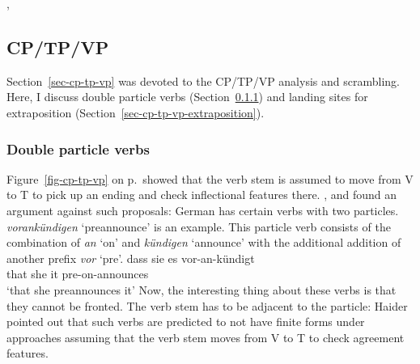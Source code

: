 \citet*{GKPS85a}, \citet{Sag2020a}

\fi

\subsection{CP/TP/VP}
\label{sec-cp-tp-vp-and-verb-last-non-movement}

Section~\ref{sec-cp-tp-vp} was devoted to the CP/TP/VP analysis and
scrambling. Here, I discuss double particle verbs (Section~\ref{sec-cp-tp-vp-double-particles}) and landing sites for extraposition (Section~\ref{sec-cp-tp-vp-extraposition}).

\subsubsection{Double particle verbs}
\label{sec-cp-tp-vp-double-particles}


Figure~\ref{fig-cp-tp-vp} on p.\,\pageref{fig-cp-tp-vp} showed that the verb stem is assumed to move from V to T to
pick up an ending and check inflectional features there. \citet[]{Haider93a},
\citet{Vikner2001a} and \citet[--60]{Haider2010a} found an
argument against such proposals: German has certain verbs with two particles. \emph{vorankündigen} `preannounce'
is an example. This particle verb consists of the combination of \emph{an} `on' and \emph{kündigen} `announce' with
the additional addition of another prefix \emph{vor} `pre'.
\ea 
\label{ex-dass-sie-es-vorankündigt}
\gll dass sie es vor-an-kündigt\\
     that she it pre-on-announces\\
\glt `that she preannounces it'
\z
Now, the interesting thing about these verbs is that they cannot be fronted. The verb stem has to be
adjacent to the particle:
\eal
{}
\zl
Haider pointed out that such verbs are predicted to not have finite forms under approaches assuming
that the verb stem moves from V to T to check agreement features.

